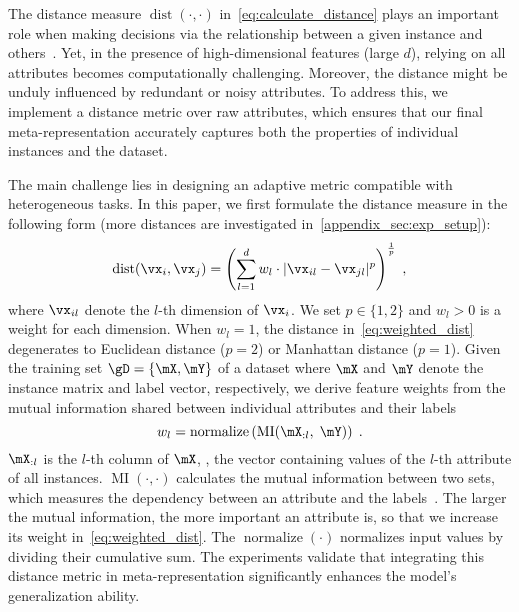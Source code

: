  The distance measure $\operatorname{dist}(\cdot,\cdot)$ in~\autoref{eq:calculate_distance} plays an important role when making decisions via the relationship between a given instance and others~\citep{ScholkopfHS01, ScholkopfS02}. Yet, in the presence of high-dimensional features (large $d$), relying on all attributes becomes computationally challenging. Moreover, the distance might be unduly influenced by redundant or noisy attributes. To address this, we implement a distance metric over raw attributes, which ensures that our final meta-representation accurately captures both the properties of individual instances and the dataset.

The main challenge lies in designing an adaptive metric compatible with heterogeneous tasks. In this paper, we first formulate the distance measure in the following form (more distances are investigated in~\autoref{appendix_sec:exp_setup}):
\begin{equation}
    \operatorname{dist}(\vx_i, \vx_j) = \left(\sum_{l=1}^d w_l \cdot |\vx_{il} - \vx_{jl}|^p\right)^{\frac{1}{p}}\;,\label{eq:weighted_dist}
\end{equation}
where $\vx_{il}$ denote the $l$-th dimension of $\vx_{i}$.
We set $p\in\{1,2\}$ and $w_l > 0$ is a weight for each dimension. When $w_l = 1$, the distance in~\autoref{eq:weighted_dist} degenerates to Euclidean distance ($p=2$) or Manhattan distance ($p=1$). Given the training set $\gD=\{\mX, \mY\}$ of a dataset where $\mX$ and $\mY$ denote the instance matrix and label vector, respectively, we derive feature weights from the mutual information shared between individual attributes and their labels
\begin{equation}
    w_l = \operatorname{normalize}\left(\operatorname{MI}(\mX_{:l},\; \mY)\right)\;.
\end{equation}
$\mX_{:l}$ is the $l$-th column of $\mX$, \ie, the vector containing values of the $l$-th attribute of all instances. $\operatorname{MI}(\cdot, \cdot)$ calculates the mutual information between two sets, which measures the dependency between an attribute and the labels~\citep{Brown2012Conditional}. The larger the mutual information, the more important an attribute is, so that we increase its weight in~\autoref{eq:weighted_dist}.
The $\operatorname{normalize}(\cdot)$ normalizes input values by dividing their cumulative sum. The experiments validate that integrating this distance metric in meta-representation significantly enhances the model's generalization ability.

